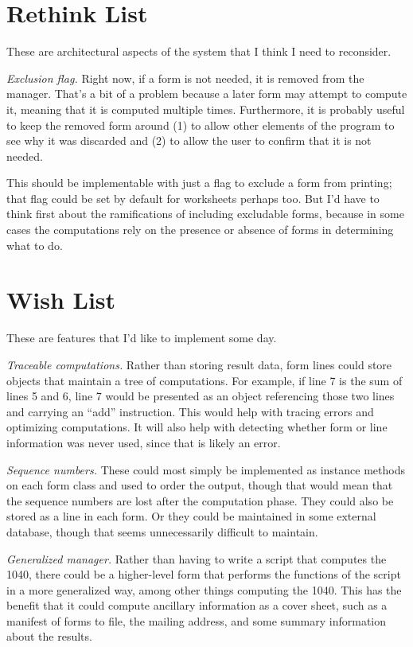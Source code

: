 \section{Rethink List}

These are architectural aspects of the system that I think I need to reconsider.

\emph{Exclusion flag.} Right now, if a form is not needed, it is removed from
the manager. That's a bit of a problem because a later form may attempt to
compute it, meaning that it is computed multiple times. Furthermore, it is
probably useful to keep the removed form around (1) to allow other elements of
the program to see why it was discarded and (2) to allow the user to confirm
that it is not needed.

This should be implementable with just a flag to exclude a form from printing;
that flag could be set by default for worksheets perhaps too. But I'd have to
think first about the ramifications of including excludable forms, because in
some cases the computations rely on the presence or absence of forms in
determining what to do.


\section{Wish List}

These are features that I'd like to implement some day.


\emph{Traceable computations.} Rather than storing result data, form lines could
store objects that maintain a tree of computations. For example, if line 7 is
the sum of lines 5 and 6, line 7 would be presented as an object referencing
those two lines and carrying an ``add'' instruction. This would help with
tracing errors and optimizing computations. It will also help with detecting
whether form or line information was never used, since that is likely an error.

\emph{Sequence numbers.} These could most simply be implemented as instance
methods on each form class and used to order the output, though that would mean
that the sequence numbers are lost after the computation phase. They could also
be stored as a line in each form. Or they could be maintained in some external
database, though that seems unnecessarily difficult to maintain.

\emph{Generalized manager.} Rather than having to write a script that computes
the 1040, there could be a higher-level form that performs the functions of the
script in a more generalized way, among other things computing the 1040. This
has the benefit that it could compute ancillary information as a cover sheet,
such as a manifest of forms to file, the mailing address, and some summary
information about the results.

